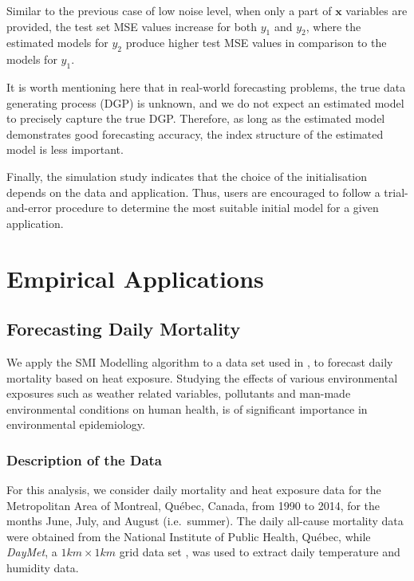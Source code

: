 \documentclass[
  11pt,
  a4paper,
]{article}
\begin{document}
Similar to the previous case of low noise level, when only a part of
\(\bm{x}\) variables are provided, the test set MSE values increase for
both \(y_{1}\) and \(y_{2}\), where the estimated models for \(y_{2}\)
produce higher test MSE values in comparison to the models for
\(y_{1}\).

It is worth mentioning here that in real-world forecasting problems, the
true data generating process (DGP) is unknown, and we do not expect an
estimated model to precisely capture the true DGP. Therefore, as long as
the estimated model demonstrates good forecasting accuracy, the index
structure of the estimated model is less important.

Finally, the simulation study indicates that the choice of the
initialisation depends on the data and application. Thus, users are
encouraged to follow a trial-and-error procedure to determine the most
suitable initial model for a given application.

\section{Empirical Applications}\label{sec-application}

\subsection{Forecasting Daily Mortality}\label{sec-mortality}

We apply the SMI Modelling algorithm to a data set used in
\textcite{Masselot2022}, to forecast daily mortality based on heat
exposure. Studying the effects of various environmental exposures such
as weather related variables, pollutants and man-made environmental
conditions on human health, is of significant importance in
environmental epidemiology.

\subsubsection{Description of the Data}\label{description-of-the-data}

For this analysis, we consider daily mortality and heat exposure data
for the Metropolitan Area of Montreal, Québec, Canada, from 1990 to
2014, for the months June, July, and August (i.e.~summer). The daily
all-cause mortality data were obtained from the National Institute of
Public Health, Québec, while \emph{DayMet}, a \(1km \times 1km\) grid
data set \autocite{Thornton2021}, was used to extract daily temperature
and humidity data.
\end{document}
